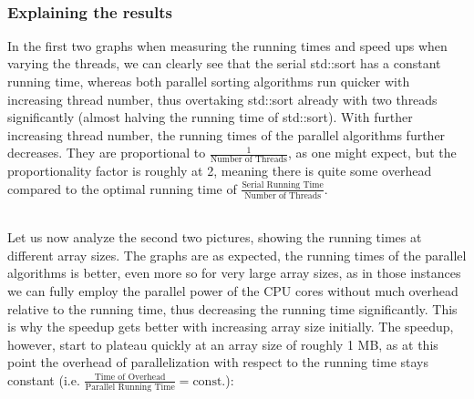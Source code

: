 \documentclass[../../main.tex]{subfiles}
\begin{document}
~\\
\subsubsection{Explaining the results}
In the first two graphs when measuring the running times and speed ups when varying the threads, we can clearly see that the serial std::sort has a constant running time, whereas both parallel sorting algorithms run quicker with increasing thread number, thus overtaking std::sort already with two threads significantly (almost halving the running time of std::sort).
With further increasing thread number, the running times of the parallel algorithms further decreases.
They are proportional to $\frac{1}{\text{Number of Threads}}$, as one might expect, but the proportionality factor is roughly at 2, meaning there is quite some overhead compared to the optimal running time of $\frac{\text{Serial Running Time}}{\text{Number of Threads}}$.

\bigskip

~\\
Let us now analyze the second two pictures, showing the running times at different array sizes.
The graphs are as expected, the running times of the parallel algorithms is better, even more so for very large array sizes, as in those instances we can fully employ the parallel power of the CPU cores without much overhead relative to the running time, thus decreasing the running time significantly.
This is why the speedup gets better with increasing array size initially.
The speedup, however, start to plateau quickly at an array size of roughly 1 MB, as at this point the overhead of parallelization with respect to the running time stays constant (i.e. $\frac{\text{Time of Overhead}}{\text{Parallel Running Time}} = \text{const.}$):
\end{document}
